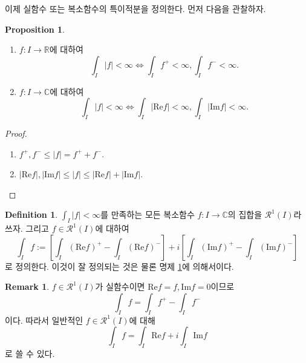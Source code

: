 \documentclass[11pt]{book}
\numberwithin{equation}{chapter}
\def\RR{\mathbb{R}}
\def\CC{\mathbb{C}}
\def\calR{\mathcal{R}}
\newcommand{\abs}[1]{\left\vert#1\right\vert}
\newcommand{\sqbracket}[1]{\left[#1\right]}
\theoremstyle{definition}
\newtheorem{prop}[thm]{Proposition}
\newtheorem{defn}[thm]{Definition}
\newtheorem*{rem}{Remark}
\newenvironment{enum}
	{\begin{enumerate}[label=(\alph*), leftmargin=2\parindent]}
	{\end{enumerate}}
\begin{document}
이제 실함수 또는 복소함수의 특이적분을 정의한다. 먼저 다음을 관찰하자.

\begin{prop} \label{13.1.7}
    \quad

    \begin{enum}
        \item \(f : I \to \RR\)에 대하여
        \[
        \int_I \abs{f} < \infty \iff \int_I f^+ < \infty, \int_I f^- < \infty.    
        \]
        \item \(f : I \to \CC\)에 대하여
        \[
            \int_I \abs{f} < \infty \iff \int_I \abs{\mathrm{Re}f} < \infty, \int_I \abs{\mathrm{Im}f} < \infty.
        \]
    \end{enum}
\end{prop}
\begin{proof}
    \quad

    \begin{enum}
        \item \(f^+, f^- \le \abs{f} = f^+ + f^-\).
        \item \(\abs{\mathrm{Re}f}, \abs{\mathrm{Im}f} \le \abs{f} \le \abs{\mathrm{Re}f} + \abs{\mathrm{Im}f}\).
    \end{enum}
\end{proof}

\begin{defn}
    \(\int_I \abs{f} < \infty  \)를 만족하는 모든 복소함수 \(f : I \to \CC\)의 집합을 \(\calR^1(I)\)라 쓰자. 그리고 \(f \in \calR^1(I)\)에 대하여
    \[
    \int_I f := \sqbracket{\int_I (\mathrm{Re}f)^+ - \int_I (\mathrm{Re}f)^-} + i \sqbracket{\int_I (\mathrm{Im}f)^+ - \int_I (\mathrm{Im}f)^-}
    \]
    로 정의한다. 이것이 잘 정의되는 것은 물론 명제 \ref{13.1.7}에 의해서이다.
\end{defn}

\begin{rem}
    \(f \in \calR^1(I)\)가 실함수이면 \(\mathrm{Re}f = f, \mathrm{Im}f = 0\)이므로
    \[
    \int_I f = \int_I f^+ - \int_I f^-
    \]
    이다. 따라서 일반적인 \(f \in \calR^1(I)\)에 대해
    \[
    \int_I f = \int_I \mathrm{Re}f + i\int_I \mathrm{Im}f    
    \]
    로 쓸 수 있다.
\end{rem}
\end{document}
